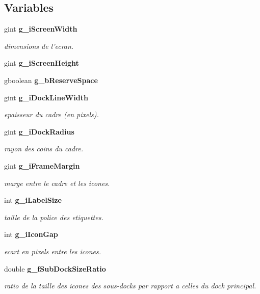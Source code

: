 \subsection*{Variables}
\begin{CompactItemize}
\item 
gint {\bf g\_\-i\-Screen\-Width}
\begin{CompactList}\small\item\em dimensions de l'ecran. \item\end{CompactList}\item 
gint {\bf g\_\-i\-Screen\-Height}
\item 
gboolean {\bf g\_\-b\-Reserve\-Space}
\item 
gint {\bf g\_\-i\-Dock\-Line\-Width}
\begin{CompactList}\small\item\em epaisseur du cadre (en pixels). \item\end{CompactList}\item 
gint {\bf g\_\-i\-Dock\-Radius}
\begin{CompactList}\small\item\em rayon des coins du cadre. \item\end{CompactList}\item 
gint {\bf g\_\-i\-Frame\-Margin}
\begin{CompactList}\small\item\em marge entre le cadre et les icones. \item\end{CompactList}\item 
int {\bf g\_\-i\-Label\-Size}
\begin{CompactList}\small\item\em taille de la police des etiquettes. \item\end{CompactList}\item 
int {\bf g\_\-i\-Icon\-Gap}
\begin{CompactList}\small\item\em ecart en pixels entre les icones. \item\end{CompactList}\item 
double {\bf g\_\-f\-Sub\-Dock\-Size\-Ratio}
\begin{CompactList}\small\item\em ratio de la taille des icones des sous-docks par rapport a celles du dock principal. \item\end{CompactList}\item 

\end{CompactItemize}
